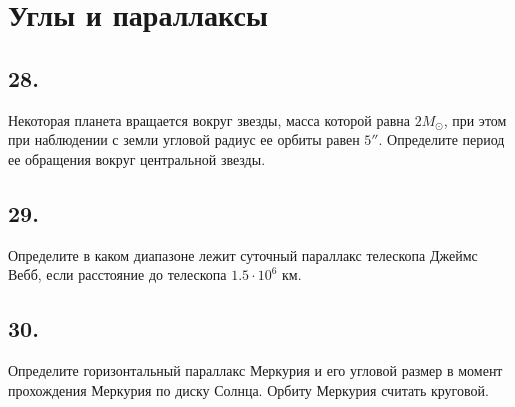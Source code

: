 \documentclass[a4paper,12pt]{article}
\begin{document}
\section*{Углы и параллаксы}

\subsection*{28.}

Некоторая планета вращается вокруг звезды, масса которой равна $2M_{\odot}$, при этом при наблюдении с земли угловой радиус ее орбиты равен $5''$. Определите период ее обращения вокруг центральной звезды.

\subsection*{29.}

Определите в каком диапазоне лежит суточный параллакс телескопа Джеймс Вебб, если расстояние до телескопа $1.5 \cdot 10^6$ км.

\subsection*{30.}

Определите горизонтальный параллакс Меркурия и его угловой размер в
момент прохождения Меркурия по диску Солнца. Орбиту Меркурия считать круговой. %


	
	
	
\end{document}
